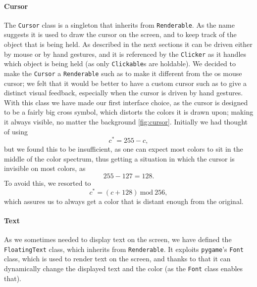 \documentclass[a4paper, 11pt, twocolumn]{IEEEtran}
\begin{document}
    \paragraph*{Cursor} The \texttt{Cursor} class is a singleton that inherits from \texttt{Renderable}. As the name suggests it is used to draw the cursor on the screen, and to keep track of the object that is being held. As described in the next sections it can be driven either by mouse or by hand gestures, and it is referenced by the \texttt{Clicker} as it handles which object is being held (as only \texttt{Clickable}s are holdable). We decided to make the \texttt{Cursor} a \texttt{Renderable} such as to make it different from the os mouse cursor; we felt that it would be better to have a custom cursor such as to give a distinct visual feedback, especially when the cursor is driven by hand gestures. With this class we have made our first interface choice, as the cursor is designed to be a fairly big cross symbol, which distorts the colors it is drawn upon; making it always visible, no matter the background \ref{fig:cursor}. Initially we had thought of using
    \begin{equation}
        c^* = 255 - c,
    \end{equation}
    but we found this to be insufficient, as one can expect most colors to sit in the middle of the color spectrum, thus getting a situation in which the cursor is invisible on most colors, as
    \begin{equation}
        255 - 127 = 128.
    \end{equation}
    To avoid this, we resorted to
    \begin{equation}
        c^* = (c + 128)\ \mathrm{mod}\ 256,
    \end{equation}
    which assures us to always get a color that is distant enough from the original.
    \paragraph*{Text} As we sometimes needed to display text on the screen, we have defined the \texttt{FloatingText} class, which inherits from \texttt{Renderable}. It exploits \texttt{pygame}'s \texttt{Font} class, which is used to render text on the screen, and thanks to that it can dynamically change the displayed text and the color (as the \texttt{Font} class enables that).
\end{document}
